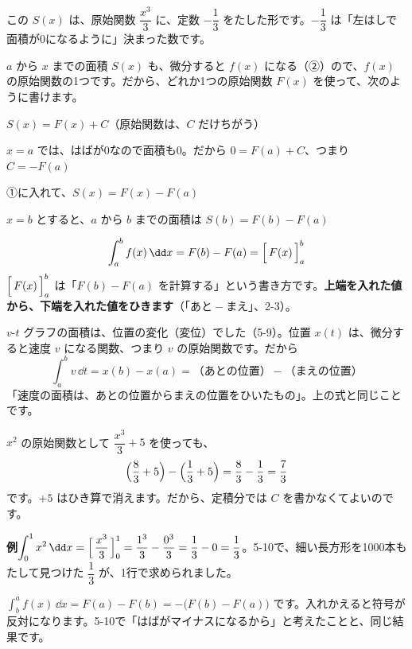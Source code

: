 この $S(x)$ は、原始関数 $\dfrac{x^3}{3}$ に、定数 $-\dfrac{1}{3}$ をたした形です。$-\dfrac{1}{3}$ は「左はしで面積が0になるように」決まった数です。

\par
$a$ から $x$ までの面積 $S(x)$ も、微分すると $f(x)$ になる（②）ので、$f(x)$ の原始関数の1つです。だから、どれか1つの原始関数 $F(x)$ を使って、次のように書けます。
\begin{enumerate}[label={\bkcircled[bkTheme]{\arabic*}}, leftmargin=2.4\zw, itemsep=1pt, topsep=2pt]
\item $S(x)=F(x)+C$\quad（原始関数は、$C$ だけちがう）
\item $x=a$ では、はばが0なので面積も0。だから $0=F(a)+C$、つまり $C=-F(a)$
\item ①に入れて、$S(x)=F(x)-F(a)$
\item $x=b$ とすると、$a$ から $b$ までの面積は $S(b)=F(b)-F(a)$
\end{enumerate}
\[ \int_a^b f(x)\,\dd x=F(b)-F(a)=\Bigl[\,F(x)\,\Bigr]_a^b \]
$\Bigl[\,F(x)\,\Bigr]_a^b$ は「$F(b)-F(a)$ を計算する」という書き方です。\textbf{上端を入れた値から、下端を入れた値をひきます}（「あと${}-{}$まえ」、2-3）。

\par
$v$-$t$ グラフの面積は、位置の変化（変位）でした（5-9）。位置 $x(t)$ は、微分すると速度 $v$ になる関数、つまり $v$ の原始関数です。だから
\[ \int_a^b v\,\dd t=x(b)-x(a)=\text{（あとの位置）}-\text{（まえの位置）} \]
「速度の面積は、あとの位置からまえの位置をひいたもの」。上の式と同じことです。

\par
$x^2$ の原始関数として $\dfrac{x^3}{3}+5$ を使っても、
\[ \Bigl(\frac{8}{3}+5\Bigr)-\Bigl(\frac{1}{3}+5\Bigr)=\frac{8}{3}-\frac{1}{3}=\frac{7}{3} \]
です。$+5$ はひき算で消えます。だから、定積分では $C$ を書かなくてよいのです。

\noindent\textbf{例}\quad $\displaystyle\int_0^1x^2\,\dd x=\Bigl[\,\frac{x^3}{3}\,\Bigr]_0^1=\frac{1^3}{3}-\frac{0^3}{3}=\frac{1}{3}-0=\frac{1}{3}$。5-10で、細い長方形を1000本もたして見つけた $\dfrac{1}{3}$ が、1行で求められました。

\par
$\displaystyle\int_b^a f(x)\,\dd x=F(a)-F(b)=-\bigl(F(b)-F(a)\bigr)$ です。入れかえると符号が反対になります。5-10で「はばがマイナスになるから」と考えたことと、同じ結果です。

